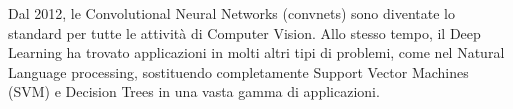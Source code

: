 Dal 2012, le Convolutional Neural Networks (convnets) sono diventate lo standard per tutte le attività di Computer Vision. Allo stesso tempo, il Deep Learning ha trovato applicazioni in molti altri tipi di problemi, come nel Natural Language processing, sostituendo completamente Support Vector Machines (SVM) e Decision Trees in una vasta gamma di applicazioni.

